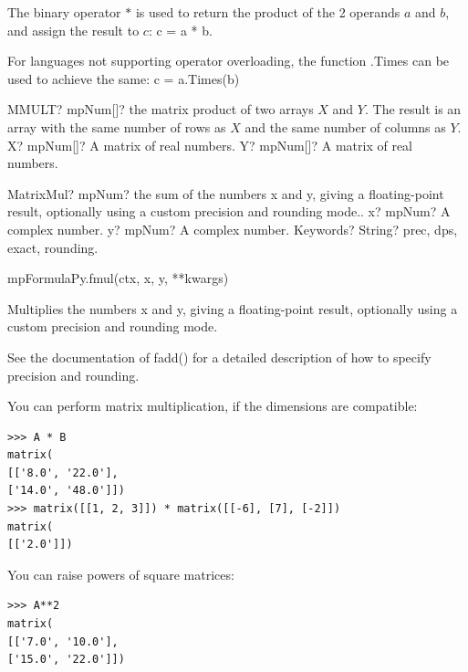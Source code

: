 \vspace{0.3cm}
The binary operator $*$ is used to return the product of the 2 operands $a$ and $b$, and assign the result to $c$: \textsf{c = a * b}.

For languages not supporting operator overloading, the function \textsf{.Times} can be used to achieve the same: \textsf{c = a.Times(b)}


\begin{mpFunctionsExtract}
	\mpWorksheetFunctionTwoNotImplemented
	{MMULT? mpNum[]? the matrix product of two arrays $X$ and $Y$. The result is an array with the same number of rows as $X$ and the same number of columns as $Y$.}
	{X? mpNum[]? A matrix of real numbers.}
	{Y? mpNum[]? A matrix of real numbers.}
\end{mpFunctionsExtract}




\vspace{0.3cm}
\begin{mpFunctionsExtract}
	\mpFunctionThree
	{MatrixMul? mpNum? the sum of the numbers x and y, giving a floating-point result, optionally using a custom precision and rounding mode..}
	{x? mpNum? A complex number.}
	{y? mpNum? A complex number.}
	{Keywords? String? prec, dps, exact, rounding.}	
\end{mpFunctionsExtract}


mpFormulaPy.fmul(ctx, x, y, **kwargs)

\vpara
Multiplies the numbers x and y, giving a floating-point result, optionally using a custom precision and rounding mode.

\vpara
See the documentation of fadd() for a detailed description of how to specify precision and rounding.




You can perform matrix multiplication, if the dimensions are compatible:

\begin{lstlisting}
>>> A * B
matrix(
[['8.0', '22.0'],
['14.0', '48.0']])
>>> matrix([[1, 2, 3]]) * matrix([[-6], [7], [-2]])
matrix(
[['2.0']])
\end{lstlisting}

You can raise powers of square matrices:

\begin{lstlisting}
>>> A**2
matrix(
[['7.0', '10.0'],
['15.0', '22.0']])
\end{lstlisting}

















